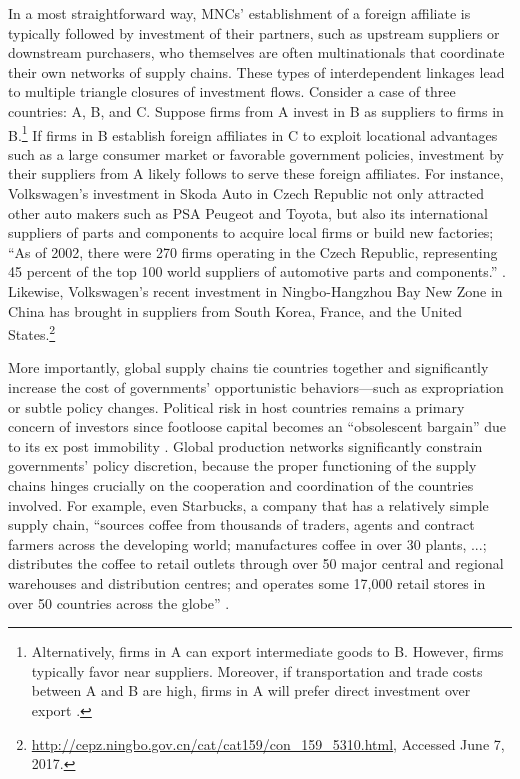\documentclass[reqno,onecolumn,letterpaper,12pt]{article}
\begin{document}
In a most straightforward way, MNCs' establishment of a foreign affiliate is typically followed by investment of their partners, such as upstream suppliers or downstream purchasers, who themselves are often multinationals that coordinate their own networks of supply chains. These types of interdependent linkages lead to multiple triangle closures of investment flows. Consider a case of three countries: A, B, and C. Suppose firms from A invest in B as suppliers to firms in B.\footnote{Alternatively, firms in A can export intermediate goods to B. However, firms typically favor near suppliers. Moreover, if transportation and trade costs between A and B are high, firms in A will prefer direct investment over export \citep{Carr_et_al:2001}. } If firms in B establish foreign affiliates in C to exploit locational advantages such as a large consumer market or favorable government policies, investment by their suppliers from A likely follows to serve these foreign affiliates. For instance, Volkswagen's investment in Skoda Auto in Czech Republic not only attracted other auto makers such as PSA Peugeot and Toyota, but also its international suppliers of parts and components to acquire local firms or build new factories; ``As of 2002, there were 270 firms operating in the Czech Republic, representing 45 percent of the top 100 world suppliers of automotive parts and components.'' \citep[352]{Kaminski_Javorcik:2005}. Likewise, Volkswagen's recent investment in Ningbo-Hangzhou Bay New Zone in China has brought in suppliers from South Korea, France, and the United States.\footnote{\url{http://cepz.ningbo.gov.cn/cat/cat159/con_159_5310.html}, Accessed June 7, 2017.}

More importantly, global supply chains tie countries together and significantly increase the cost of governments' opportunistic behaviors---such as expropriation or subtle policy changes. Political risk in host countries remains a primary concern of investors since footloose capital becomes an ``obsolescent bargain'' due to its ex post immobility \citep{Vernon:1971,Vernon:1980}. Global production networks significantly constrain governments' policy discretion, because the proper functioning of the supply chains hinges crucially on the cooperation and coordination of the countries involved. For example, even Starbucks, a company that has a relatively simple supply chain, ``sources coffee from thousands of traders, agents and contract farmers across the developing world; manufactures coffee in over 30 plants, ...; distributes the coffee to retail outlets through over 50 major central and regional warehouses and distribution centres; and operates some 17,000 retail stores in over 50 countries across the globe'' \citep[142]{UNCTAD:2013}.
\end{document}
